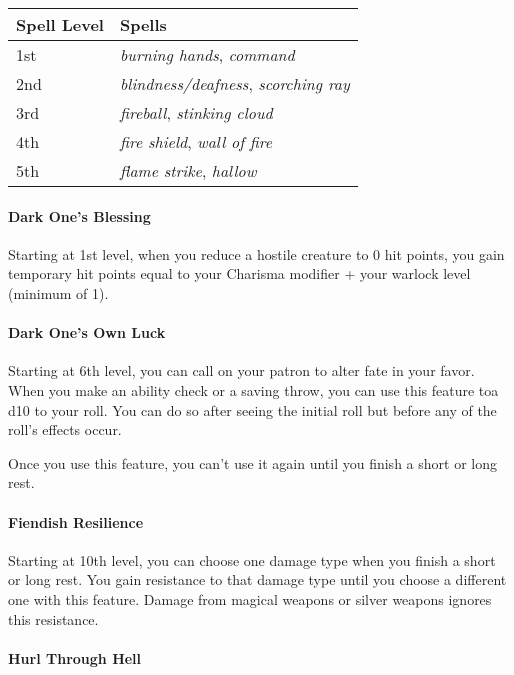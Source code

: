 \documentclass[
]{article}
\begin{document}
\begin{longtable}[]{@{}ll@{}}
\toprule
Spell Level & Spells\tabularnewline
\midrule
\endhead
1st & \emph{burning hands}, \emph{command}\tabularnewline
2nd & \emph{blindness/deafness}, \emph{scorching ray}\tabularnewline
3rd & \emph{fireball}, \emph{stinking cloud}\tabularnewline
4th & \emph{fire shield}, \emph{wall of fire}\tabularnewline
5th & \emph{flame strike}, \emph{hallow}\tabularnewline
\bottomrule
\end{longtable}

\hypertarget{dark-ones-blessing}{%
\paragraph{Dark One's Blessing}\label{dark-ones-blessing}}

Starting at 1st level, when you reduce a hostile creature to 0 hit
points, you gain temporary hit points equal to your Charisma modifier +
your warlock level (minimum of 1).

\hypertarget{dark-ones-own-luck}{%
\paragraph{Dark One's Own Luck}\label{dark-ones-own-luck}}

Starting at 6th level, you can call on your patron to alter fate in your
favor. When you make an ability check or a saving throw, you can use
this feature toa d10 to your roll. You can do so after seeing the
initial roll but before any of the roll's effects occur.

Once you use this feature, you can't use it again until you finish a
short or long rest.

\hypertarget{fiendish-resilience}{%
\paragraph{Fiendish Resilience}\label{fiendish-resilience}}

Starting at 10th level, you can choose one damage type when you finish a
short or long rest. You gain resistance to that damage type until you
choose a different one with this feature. Damage from magical weapons or
silver weapons ignores this resistance.

\hypertarget{hurl-through-hell}{%
\paragraph{Hurl Through Hell}\label{hurl-through-hell}}
\end{document}

